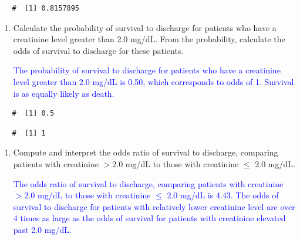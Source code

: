 \documentclass[letterpaper,12pt,twoside,]{pinp}
\begin{document}
\begin{enumerate}
  \begin{ShadedResult}
   \begin{verbatim}
   #  [1] 0.8157895
   \end{verbatim}
   \end{ShadedResult}

  \begin{enumerate}
  \def\labelenumii{\alph{enumii})}
  \setcounter{enumii}{1}
  \item
    Calculate the probability of survival to discharge for patients who
    have a creatinine level greater than 2.0 mg/dL. From the
    probability, calculate the odds of survival to discharge for these
    patients.

    \textcolor{blue}{The probability of survival to discharge for patients who have a creatinine level greater than 2.0 mg/dL is 0.50, which corresponds to odds of 1. Survival is as equally likely as death.}
  \end{enumerate}

\begin{Shaded}
\begin{Highlighting}[]
\StringTok{ }\OperatorTok{/}
\end{Highlighting}
\end{Shaded}

  \begin{ShadedResult}
   \begin{verbatim}
   #  [1] 0.5
   \end{verbatim}
   \end{ShadedResult}

\begin{Shaded}
\begin{Highlighting}[]
\StringTok{ }\OperatorTok{/}\NormalTok{(} \OperatorTok{-}\StringTok{ }
\end{Highlighting}
\end{Shaded}

  \begin{ShadedResult}
   \begin{verbatim}
   #  [1] 1
   \end{verbatim}
   \end{ShadedResult}

  \begin{enumerate}
  \def\labelenumii{\alph{enumii})}
  \setcounter{enumii}{2}
  \item
    Compute and interpret the odds ratio of survival to discharge,
    comparing patients with creatinine \(> 2.0\) mg/dL to those with
    creatinine \(\leq\) 2.0 mg/dL.

    \textcolor{blue}{The odds ratio of survival to discharge, comparing patients with creatinine $> 2.0$ mg/dL to those with creatinine $\leq$ 2.0 mg/dL is 4.43. The odds of survival to discharge for patients with relatively lower creatinine level are over 4 times as large as the odds of survival for patients with creatinine elevated past 2.0 mg/dL.}
  \end{enumerate}
\end{enumerate}
\end{document}
